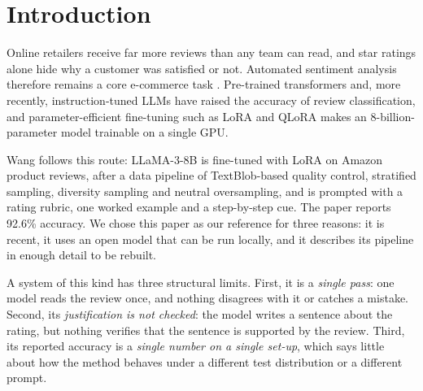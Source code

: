 \documentclass[runningheads]{llncs}
\begin{document}
\section{Introduction}

Online retailers receive far more reviews than any team can read, and star ratings alone hide why a customer was satisfied or not. Automated sentiment analysis therefore remains a core e-commerce task \cite{pang2008}. Pre-trained transformers \cite{devlin2019bert,he2021debertav3} and, more recently, instruction-tuned LLMs \cite{grattafiori2024llama3,zhang2023sentiment} have raised the accuracy of review classification, and parameter-efficient fine-tuning such as LoRA \cite{hu2022lora} and QLoRA \cite{dettmers2023qlora} makes an 8-billion-parameter model trainable on a single GPU.

Wang \cite{wang2025} follows this route: LLaMA-3-8B is fine-tuned with LoRA on Amazon product reviews, after a data pipeline of TextBlob-based quality control, stratified sampling, diversity sampling and neutral oversampling, and is prompted with a rating rubric, one worked example and a step-by-step cue. The paper reports 92.6\% accuracy. We chose this paper as our reference for three reasons: it is recent, it uses an open model that can be run locally, and it describes its pipeline in enough detail to be rebuilt.

A system of this kind has three structural limits. First, it is a \emph{single pass}: one model reads the review once, and nothing disagrees with it or catches a mistake. Second, its \emph{justification is not checked}: the model writes a sentence about the rating, but nothing verifies that the sentence is supported by the review. Third, its reported accuracy is a \emph{single number on a single set-up}, which says little about how the method behaves under a different test distribution or a different prompt.
\end{document}

